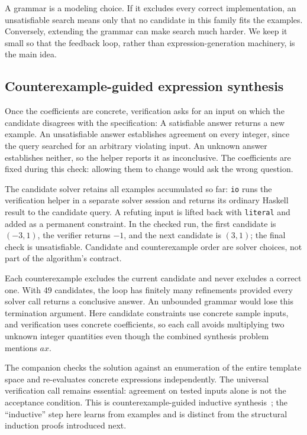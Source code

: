 \documentclass[review]{jfp-epi}
\newcommand{\code}[1]{\texttt{#1}}
\begin{document}
A grammar is a modeling choice. If it excludes every correct implementation,
an unsatisfiable search means only that no candidate in this family fits the
examples. Conversely, extending the grammar can make search much harder. We
keep it small so that the feedback loop, rather than expression-generation
machinery, is the main idea.


\subsection{Counterexample-guided expression synthesis}
\label{sec:synthesis-candidates}

Once the coefficients are concrete, verification asks for an input on which the
candidate disagrees with the specification:
A satisfiable answer returns a new example. An unsatisfiable answer establishes
agreement on every integer, since the query searched for an arbitrary violating
input. An unknown answer establishes neither, so the helper reports it as
inconclusive. The coefficients are fixed during this check: allowing them to
change would ask the wrong question.

The candidate solver retains all examples accumulated so far:
\code{io} runs the verification helper in a separate solver session and returns
its ordinary Haskell result to the candidate query. A refuting input is lifted
back with \code{literal} and added as a permanent constraint. In the checked
run, the first candidate is $(-3,1)$, the verifier returns $-1$, and the next
candidate is $(3,1)$; the final check is unsatisfiable. Candidate and
counterexample order are solver choices, not part of the algorithm's contract.

Each counterexample excludes the current candidate and never excludes a correct
one. With 49 candidates, the loop has finitely many refinements provided every
solver call returns a conclusive answer. An unbounded grammar would lose this
termination argument. Here candidate constraints use concrete sample inputs,
and verification uses concrete coefficients, so each call avoids multiplying
two unknown integer quantities even though the combined synthesis problem
mentions $a x$.

The companion checks the solution against an enumeration of the entire template
space and re-evaluates concrete expressions independently. The universal
verification call remains essential: agreement on tested inputs alone is not
the acceptance condition. This is counterexample-guided inductive
synthesis~\citep{sketch};
the ``inductive'' step here learns from examples and is distinct from the
structural induction proofs introduced next.
\end{document}
